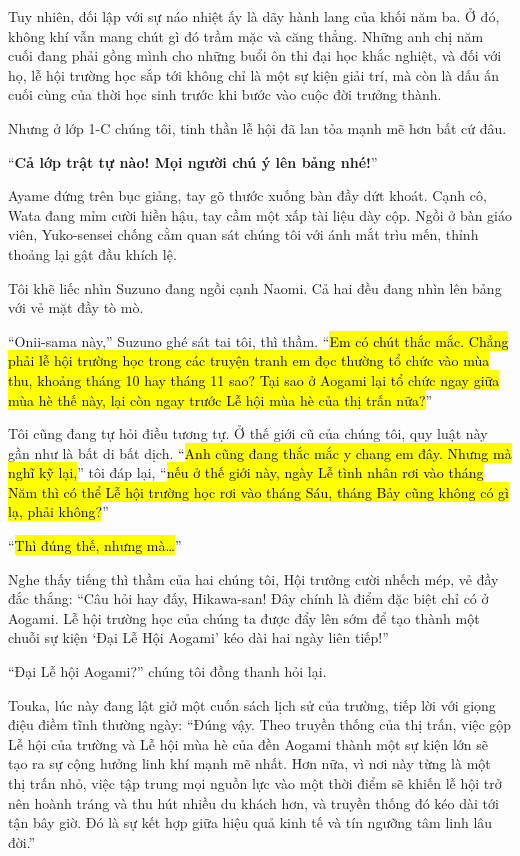 \documentclass[../main.tex]{subfiles}
\begin{document}
Tuy nhiên, đối lập với sự náo nhiệt ấy là dãy hành lang của khối năm ba. Ở đó, không khí vẫn mang chút gì đó trầm mặc và căng thẳng. Những anh chị năm cuối đang phải gồng mình cho những buổi ôn thi đại học khắc nghiệt, và đối với họ, lễ hội trường học sắp tới không chỉ là một sự kiện giải trí, mà còn là dấu ấn cuối cùng của thời học sinh trước khi bước vào cuộc đời trưởng thành.

Nhưng ở lớp 1-C chúng tôi, tinh thần lễ hội đã lan tỏa mạnh mẽ hơn bất cứ đâu.

``\textbf{Cả lớp trật tự nào! Mọi người chú ý lên bảng nhé!}''

Ayame đứng trên bục giảng, tay gõ thước xuống bàn đầy dứt khoát. Cạnh cô, Wata đang mỉm cười hiền hậu, tay cầm một xấp tài liệu dày cộp. Ngồi ở bàn giáo viên, Yuko-sensei chống cằm quan sát chúng tôi với ánh mắt trìu mến, thỉnh thoảng lại gật đầu khích lệ.

Tôi khẽ liếc nhìn Suzuno đang ngồi cạnh Naomi. Cả hai đều đang nhìn lên bảng với vẻ mặt đầy tò mò.

``Onii-sama này,'' Suzuno ghé sát tai tôi, thì thầm. ``\hl{Em có chút thắc mắc. Chẳng phải lễ hội trường học trong các truyện tranh em đọc thường tổ chức vào mùa thu, khoảng tháng 10 hay tháng 11 sao? Tại sao ở Aogami lại tổ chức ngay giữa mùa hè thế này, lại còn ngay trước Lễ hội mùa hè của thị trấn nữa?}''

Tôi cũng đang tự hỏi điều tương tự. Ở thế giới cũ của chúng tôi, quy luật này gần như là bất di bất dịch. ``\hl{Anh cũng đang thắc mắc y chang em đây. Nhưng mà nghĩ kỹ lại,}'' tôi đáp lại, ``\hl{nếu ở thế giới này, ngày Lễ tình nhân rơi vào tháng Năm thì có thể Lễ hội trường học rơi vào tháng Sáu, tháng Bảy cũng không có gì lạ, phải không?}''

``\hl{Thì đúng thế, nhưng mà\dots}''

Nghe thấy tiếng thì thầm của hai chúng tôi, Hội trưởng cười nhếch mép, vẻ đầy đắc thắng: ``Câu hỏi hay đấy, Hikawa-san! Đây chính là điểm đặc biệt chỉ có ở Aogami. Lễ hội trường học của chúng ta được đẩy lên sớm để tạo thành một chuỗi sự kiện `Đại Lễ Hội Aogami' kéo dài hai ngày liên tiếp!''

``Đại Lễ hội Aogami?'' chúng tôi đồng thanh hỏi lại.

Touka, lúc này đang lật giở một cuốn sách lịch sử của trường, tiếp lời với giọng điệu điềm tĩnh thường ngày: ``Đúng vậy. Theo truyền thống của thị trấn, việc gộp Lễ hội của trường và Lễ hội mùa hè của đền Aogami thành một sự kiện lớn sẽ tạo ra sự cộng hưởng linh khí mạnh mẽ nhất. Hơn nữa, vì nơi này từng là một thị trấn nhỏ, việc tập trung mọi nguồn lực vào một thời điểm sẽ khiến lễ hội trở nên hoành tráng và thu hút nhiều du khách hơn, và truyền thống đó kéo dài tới tận bây giờ. Đó là sự kết hợp giữa hiệu quả kinh tế và tín ngưỡng tâm linh lâu đời.''
\end{document}
